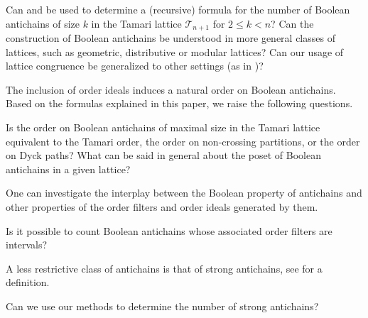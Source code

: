 \documentclass{preprint}
\newcommand{\cT}{\mathcal{T}}
\theoremstyle{definition}
\begin{document}
\begin{question}
    Can  and  be used to determine a (recursive) formula for the number of Boolean antichains of size $k$ in the Tamari lattice $\cT_{n+1}$ for $2\leq k < n$? Can the construction of Boolean antichains be understood in more general classes of lattices, such as geometric, distributive or modular lattices? Can our usage of lattice congruence be generalized to other settings (as in )?
\end{question}

The inclusion of order ideals induces a natural order on Boolean antichains. Based on the formulas explained in this paper, we raise the following questions.

\begin{question}
Is the order on Boolean antichains of maximal size in the Tamari lattice equivalent to the Tamari order, the order on non-crossing partitions, or the order on Dyck paths? What can be said in general about the poset of Boolean antichains in a given lattice?
\end{question}

One can investigate the interplay between the Boolean property of antichains and other properties of the order filters and order ideals generated by them.

\begin{question}
Is it possible to count Boolean antichains whose associated order filters are intervals? 
\end{question}

A less restrictive class of antichains is that of strong antichains, see \cite{gottesman2024antichains} for a definition.

\begin{question}
Can we use our methods to determine the number of strong antichains?
\end{question}

\printbibliography
\end{document}
